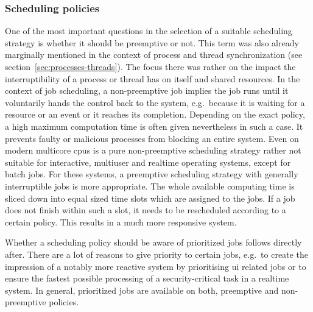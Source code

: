 \subsubsection*{Scheduling policies}
One of the most important questions in the selection of a suitable scheduling strategy is whether it should be preemptive or not.
This term was also already marginally mentioned in the context of process and thread synchronization (see section~\ref{sec:processes-threads}).
The focus there was rather on the impact the interruptibility of a process or thread has on itself and shared resources.
In the context of job scheduling, a non-preemptive job implies the job runs until it voluntarily hands the control back to the system, e.g.\ because it is waiting for a resource or an event or it reaches its completion\cite{mandl2014Grundkurs}.
Depending on the exact policy, a high maximum computation time is often given nevertheless in such a case.
It prevents faulty or malicious processes from blocking an entire system\cite{achilles2006betriebssysteme}.
Even on modern multicore \acp{cpu} is a pure non-preemptive scheduling strategy rather not suitable for interactive, multiuser and realtime operating systems, except for batch jobs.
For these systems, a preemptive scheduling strategy with generally interruptible jobs is more appropriate.
The whole available computing time is sliced down into equal sized time slots which are assigned to the jobs.
If a job does not finish within such a slot, it needs to be rescheduled according to a certain policy\cite{brause2017betriebssysteme}.
This results in a much more responsive system.

Whether a scheduling policy should be aware of prioritized jobs follows directly after.
There are a lot of reasons to give priority to certain jobs, e.g.\ to create the impression of a notably more reactive system by prioritising \ac{ui} related jobs or to ensure the fastest possible processing of a security-critical task in a realtime system\cite{mandl2014Grundkurs}.
In general, prioritized jobs are available on both, preemptive and non-preemptive policies\cite{brause2017betriebssysteme}.


